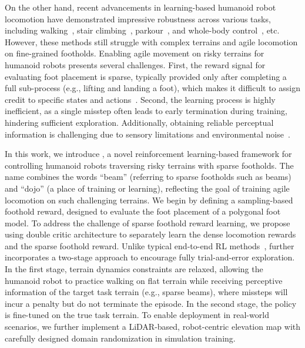 On the other hand, recent advancements in learning-based humanoid robot locomotion have demonstrated impressive robustness across various tasks, including walking~\cite{chen2024learning, radosavovic2024learning, radosavovic2024humanoid, van2024revisiting}, stair climbing~\cite{cuiadapting, gu2024advancing, long2024learninghumanoid}, parkour~\cite{zhuang2024humanoid}, and whole-body control~\cite{cheng2024expressive, fu2024humanplus, he2024omnih2o, he2024learning, he2024hover, ji2024exbody2, jiang2024harmon}, etc. However, these methods still struggle with complex terrains and agile locomotion on fine-grained footholds. Enabling agile movement on risky terrains for humanoid robots presents several challenges. First, the reward signal for evaluating foot placement is sparse, typically provided only after completing a full sub-process (e.g., lifting and landing a foot), which makes it difficult to assign credit to specific states and actions~\cite{sutton1984temporal}. Second, the learning process is highly inefficient, as a single misstep often leads to early termination during training, hindering sufficient exploration. Additionally, obtaining reliable perceptual information is challenging due to sensory limitations and environmental noise~\cite{zhuang2024humanoid}.

In this work, we introduce \beamdojo, a novel reinforcement learning-based framework for controlling humanoid robots traversing risky terrains with sparse footholds. The name \beamdojo combines the words ``beam'' (referring to sparse footholds such as beams) and ``dojo'' (a place of training or learning), reflecting the goal of training agile locomotion on such challenging terrains. We begin by defining a sampling-based foothold reward, designed to evaluate the foot placement of a polygonal foot model. To address the challenge of sparse foothold reward learning, we propose using double critic architecture to separately learn the dense locomotion rewards and the sparse foothold reward. Unlike typical end-to-end RL methods~\cite{yu2024walking, Zhang2023LearningAL}, \beamdojo further incorporates a two-stage approach to encourage fully trial-and-error exploration. In the first stage, terrain dynamics constraints are relaxed, allowing the humanoid robot to practice walking on flat terrain while receiving perceptive information of the target task terrain (e.g., sparse beams), where missteps will incur a penalty but do not terminate the episode. In the second stage, the policy is fine-tuned on the true task terrain. To enable deployment in real-world scenarios, we further implement a LiDAR-based, robot-centric elevation map with carefully designed domain randomization in simulation training.

